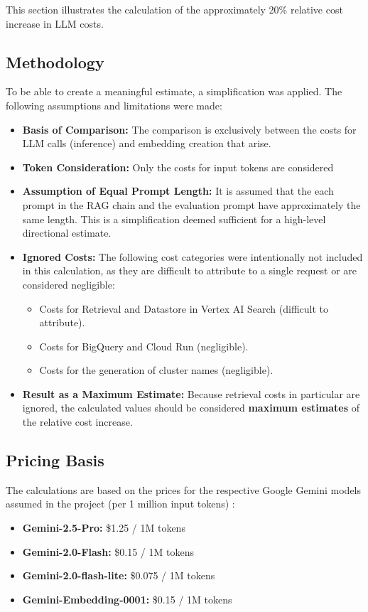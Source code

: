 \documentclass[
	english,
	ruledheaders=section,%
	class=report,%
	thesis={type=bachelor},%
	accentcolor=1b,%
	custommargins=true,%
	marginpar=false,%
	parskip=half-,%
	fontsize=11pt,%
	DIV=14,
]{tudapub}
\begin{document}
This section illustrates the calculation of the approximately 20\% relative cost increase in LLM costs.

\subsection*{Methodology}
To be able to create a meaningful estimate, a simplification was applied. The following assumptions and limitations were made:
\begin{itemize}
    \item \textbf{Basis of Comparison:} The comparison is exclusively between the costs for LLM calls (inference) and embedding creation that arise.
    \item \textbf{Token Consideration:} Only the costs for input tokens are considered
    \item \textbf{Assumption of Equal Prompt Length:} It is assumed that the each prompt in the RAG chain and the evaluation prompt have approximately the same length. This is a simplification deemed sufficient for a high-level directional estimate.
    \item \textbf{Ignored Costs:} The following cost categories were intentionally not included in this calculation, as they are difficult to attribute to a single request or are considered negligible: \begin{itemize}
        \item Costs for Retrieval and Datastore in Vertex AI Search (difficult to attribute).
        \item Costs for BigQuery and Cloud Run (negligible).
        \item Costs for the generation of cluster names (negligible).
    \end{itemize}
    \item \textbf{Result as a Maximum Estimate:} Because retrieval costs in particular are ignored, the calculated values should be considered \textbf{maximum estimates} of the relative cost increase.
\end{itemize}

\subsection*{Pricing Basis}
The calculations are based on the prices for the respective Google Gemini models assumed in the project (per 1 million input tokens) \parencite{GoogleGeminiPricing}:
\begin{itemize}
    \item \textbf{Gemini-2.5-Pro:} \$1.25 / 1M tokens
    \item \textbf{Gemini-2.0-Flash:} \$0.15 / 1M tokens
    \item \textbf{Gemini-2.0-flash-lite:} \$0.075 / 1M tokens
    \item \textbf{Gemini-Embedding-0001:} \$0.15 / 1M tokens
\end{itemize}
\end{document}
